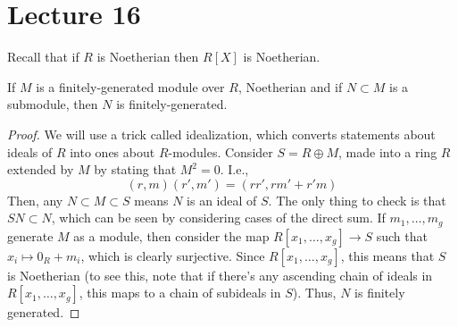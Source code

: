 \section{Lecture 16}
Recall that if $R$ is Noetherian
then $R[X]$ is Noetherian.
\begin{theorem}
    If $M$ is a finitely-generated module over $R$, Noetherian
    and if $N \subset M$ is a submodule, then $N$ is finitely-generated.
    \begin{proof}
        We will use a trick called idealization,
        which converts statements about ideals of $R$ into ones about $R$-modules.
        Consider $S = R \oplus M$, made into a ring $R$ extended by $M$
        by stating that $M^2 = 0$. I.e.,
        \[ (r, m)(r', m') = (rr', rm' + r'm) \]
        Then, any $N \subset M \subset S$
        means $N$ is an ideal of $S$. The only thing to check is that $SN \subset N$,
        which can be seen by considering cases of the direct sum. If $m_1, \dots, m_g$ generate
        $M$ as a module, then consider the map $R[x_1, \dots, x_g] \to S$
        such that $x_i \mapsto 0_R + m_i$,
        which is clearly surjective. Since $R[x_1, \dots, x_g]$, this means that
        $S$ is Noetherian (to see this, note that if there's any ascending chain of ideals in $R[x_1, \dots, x_g]$,
        this maps to a chain of subideals in $S$). Thus, $N$ is finitely generated.
    \end{proof}
\end{theorem}
